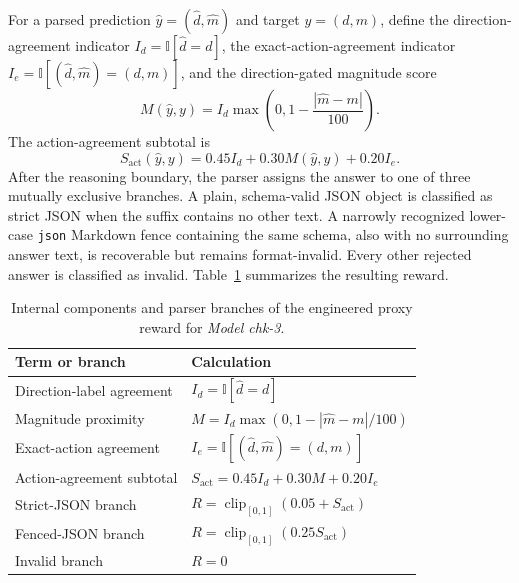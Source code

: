 For a parsed prediction $\hat{y}=(\hat{d},\hat{m})$ and target
$y=(d,m)$, define the direction-agreement indicator
$I_d=\mathbb{I}[\hat{d}=d]$, the exact-action-agreement indicator
$I_e=\mathbb{I}[(\hat{d},\hat{m})=(d,m)]$, and the direction-gated magnitude
score
\begin{equation*}
    M(\hat{y},y)
    = I_d\max\left(0,1-\frac{|\hat{m}-m|}{100}\right).
\end{equation*}
The action-agreement subtotal is
\begin{equation*}
    S_{\mathrm{act}}(\hat{y},y)
    = 0.45 I_d + 0.30 M(\hat{y},y) + 0.20 I_e.
\end{equation*}
After the reasoning boundary, the parser assigns the answer to one of three
mutually exclusive branches. A plain, schema-valid JSON object is classified
as strict JSON when the suffix contains no other text. A narrowly recognized
lower-case \texttt{json} Markdown fence containing the same schema, also with
no surrounding answer text, is recoverable but remains format-invalid. Every
other rejected answer is classified as invalid.
Table~\ref{tab:chk3-decision-reward-components} summarizes the resulting
reward.


\begin{table}[t]
\centering
\footnotesize
\caption{Internal components and parser branches of the engineered proxy
reward for \textit{Model chk-3}.}
\label{tab:chk3-decision-reward-components}
\renewcommand{\arraystretch}{1.35}
\setlength{\tabcolsep}{8pt}

\begin{tabularx}{\columnwidth}{@{}
    >{\raggedright\arraybackslash}p{}
    >{\centering\arraybackslash}X
@{}}
\toprule
\textbf{Term or branch} & \textbf{Calculation} \\
\midrule
Direction-label agreement & $I_d=\mathbb{I}[\hat{d}=d]$ \\
Magnitude proximity &
$M=I_d\max\left(0,1-|\hat{m}-m|/100\right)$ \\
Exact-action agreement & $I_e=\mathbb{I}[(\hat{d},\hat{m})=(d,m)]$ \\
Action-agreement subtotal & $S_{\mathrm{act}}=0.45I_d+0.30M+0.20I_e$ \\
Strict-JSON branch &
$R=\operatorname{clip}_{[0,1]}\left(0.05+S_{\mathrm{act}}\right)$ \\
Fenced-JSON branch &
$R=\operatorname{clip}_{[0,1]}\left(0.25S_{\mathrm{act}}\right)$ \\
Invalid branch & $R=0$ \\
\bottomrule
\end{tabularx}
\end{table}



